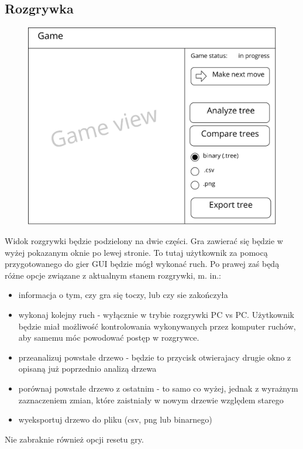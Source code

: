 \documentclass{article}
\begin{document}
	\subsection{Rozgrywka}
	\begin{figure}[h!]
		\centering
		\includegraphics[scale=0.8]{game-eps}
	\end{figure}
	Widok rozgrywki będzie podzielony na dwie części. Gra zawierać się będzie w wyżej pokazanym oknie po lewej stronie. To tutaj użytkownik za pomocą przygotowanego do gier GUI będzie mógł wykonać ruch. Po prawej zaś będą różne opcje związane z aktualnym stanem rozgrywki, m. in.:
	\begin{itemize}
		\item informacja o tym, czy gra się toczy, lub czy sie zakończyła
		\item wykonaj kolejny ruch - wyłącznie w trybie rozgrywki PC vs PC. Użytkownik będzie miał możliwość kontrolowania wykonywanych przez komputer ruchów, aby samemu móc powodować postęp w rozgrywce.
		\item przeanalizuj powstałe drzewo - będzie to przycisk otwierajacy drugie okno z opisaną już poprzednio analizą drzewa
		\item porównaj powstałe drzewo z ostatnim - to samo co wyżej, jednak z wyrażnym zaznaczeniem zmian, które zaistniały w nowym drzewie względem starego
		\item wyeksportuj drzewo do pliku (csv, png lub binarnego)
	\end{itemize}
	Nie zabraknie również opcji resetu gry.
	
\end{document}
